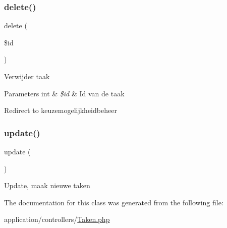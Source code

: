 \subsubsection{\texorpdfstring{delete()}{delete()}}
{\footnotesize\ttfamily delete (\begin{DoxyParamCaption}\item[{}]{\$id }\end{DoxyParamCaption})}

Verwijder taak 
\begin{DoxyParams}[1]{Parameters}
int & {\em \$id} & Id van de taak \\
\hline
\end{DoxyParams}
Redirect to keuzemogelijkheidbeheer \mbox{\label{class_taken_a842e4774e3b3601a005b995c02f7e883}} 
\subsubsection{\texorpdfstring{update()}{update()}}
{\footnotesize\ttfamily update (\begin{DoxyParamCaption}{ }\end{DoxyParamCaption})}

Update, maak nieuwe taken 

The documentation for this class was generated from the following file\+:\begin{DoxyCompactItemize}
\item 
application/controllers/\mbox{\hyperlink{_taken_8php}{Taken.\+php}}\end{DoxyCompactItemize}
